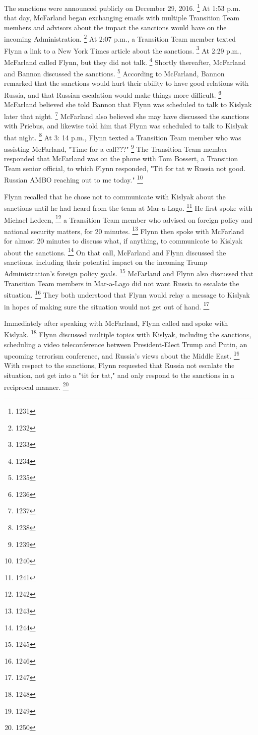 The sanctions were announced publicly on December 29, 2016.%
\footnote{1231}
At 1:53 p.m. that day, McFarland began exchanging emails with multiple Transition Team members and advisors about the impact the sanctions would have on the incoming Administration.%
\footnote{1232}
At 2:07 p.m., a Transition Team member texted Flynn a link to a New York Times article about the sanctions.%
\footnote{1233}
At 2:29 p.m., McFarland called Flynn, but they did not talk.%
\footnote{1234}
Shortly thereafter, McFarland and Bannon discussed the sanctions.%
\footnote{1235}
According to McFarland, Bannon remarked that the sanctions would hurt their ability to have good relations with Russia, and that Russian escalation would make things more difficult.%
\footnote{1236}
McFarland believed she told Bannon that Flynn was scheduled to talk to Kislyak later that night.%
\footnote{1237}
McFarland also believed she may have discussed the sanctions with Priebus, and likewise told him that Flynn was scheduled to talk to Kislyak that night.%
\footnote{1238}
At 3: 14 p.m., Flynn texted a Transition Team member who was assisting McFarland, "Time for a call???"%
\footnote{1239}
The Transition Team member responded that McFarland was on the phone with Tom Bossert, a Transition Team senior official, to which Flynn responded, "Tit for tat w Russia not good.
Russian AMBO reaching out to me today."%
\footnote{1240}

Flynn recalled that he chose not to communicate with Kislyak about the sanctions until he had heard from the team at Mar-a-Lago.%
\footnote{1241}
He first spoke with Michael Ledeen,%
\footnote{1242}
a Transition Team member who advised on foreign policy and national security matters, for 20 minutes.%
\footnote{1243}
Flynn then spoke with McFarland for almost 20 minutes to discuss what, if anything, to communicate to Kislyak about the sanctions.%
\footnote{1244}
On that call, McFarland and Flynn discussed the sanctions, including their potential impact on the incoming Trump Administration's foreign policy goals.%
\footnote{1245}
McFarland and Flynn also discussed that Transition Team members in Mar-a-Lago did not want Russia to escalate the situation.%
\footnote{1246}
They both understood that Flynn would relay a message to Kislyak in hopes of making sure the situation would not get out of hand.%
\footnote{1247}

Immediately after speaking with McFarland, Flynn called and spoke with Kislyak.%
\footnote{1248}
Flynn discussed multiple topics with Kislyak, including the sanctions, scheduling a video teleconference between President-Elect Trump and Putin, an upcoming terrorism conference, and Russia's views about the Middle East.%
\footnote{1249}
With respect to the sanctions, Flynn requested that Russia not escalate the situation, not get into a "tit for tat," and only respond to the sanctions in a reciprocal manner.%
\footnote{1250}

